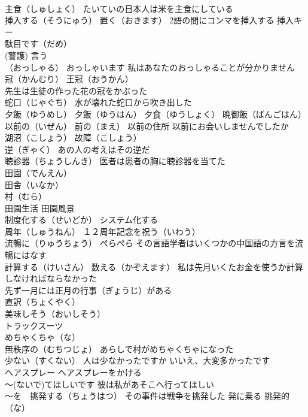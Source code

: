 \documentclass[8pt]{extreport}
\begin{document}
\begin{CJK}{UTF8}{min}
\\	主食（しゅしょく） たいていの日本人は米を主食にしている
\\	挿入する（そうにゅう） 置く（おきます） 2語の間にコンマを挿入する 挿入キー
\\	駄目です（だめ）
\\	(警護) 言う 
\\	（おっしゃる） おっしゃいます 私はあなたのおっしゃることが分かりません
\\	冠（かんむり） 王冠（おうかん）
\\	先生は生徒の作った花の冠をかぶった
\\	蛇口（じゃぐち） 水が壊れた蛇口から吹き出した
\\	夕飯（ゆうめし） 夕飯（ゆうはん） 夕食（ゆうしょく） 晩御飯（ばんごはん）
\\	以前の（いぜん） 前の（まえ） 以前の住所 以前にお会いしませんでしたか
\\	湖沼（こしょう） 故障（こしょう）
\\	逆（ぎゃく） あの人の考えはその逆だ
\\	聴診器（ちょうしんき） 医者は患者の胸に聴診器を当てた
\\	田園（でんえん）
\\	田舎（いなか）
\\	村（むら） 
\\	田園生活 田園風景
\\	制度化する（せいどか） システム化する
\\	周年（しゅうねん） １２周年記念を祝う（いわう）
\\	流暢に（りゅうちょう） ぺらぺら その言語学者はいくつかの中国語の方言を流暢にはなす
\\	計算する（けいさん） 数える（かぞえます） 私は先月いくたお金を使うか計算しなければならなかった
\\	先ず一月には正月の行事（ぎょうじ）がある
\\	直訳（ちょくやく）
\\	美味しそう（おいしそう）
\\	トラックスーツ
\\	めちゃくちゃ（な）
\\	無秩序の（むちつじょ） あらしで村がめちゃくちゃになった
\\	少ない（すくない） 人は少なかったですか いいえ、大変多かったです
\\	ヘアスプレー ヘアスプレーをかける
\\	～(ないで)てほしいです 彼は私があそこへ行ってほしい
\\	～を　挑発する（ちょうはつ） その事件は戦争を挑発した 発に乗る 挑発的（な）

\end{CJK}
\end{document}
